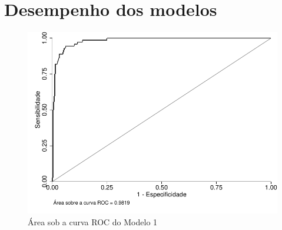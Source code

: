 \newpage
\section{Desempenho dos modelos}
\label{sec:desempenho}

\begin{figure}[!htbp]
	\label{fig:figura4}
	\caption{Área sob a curva ROC do Modelo 1}
	\begin{center}
	    \includegraphics[scale=1]{roc1.pdf}
	\end{center}
\end{figure}
